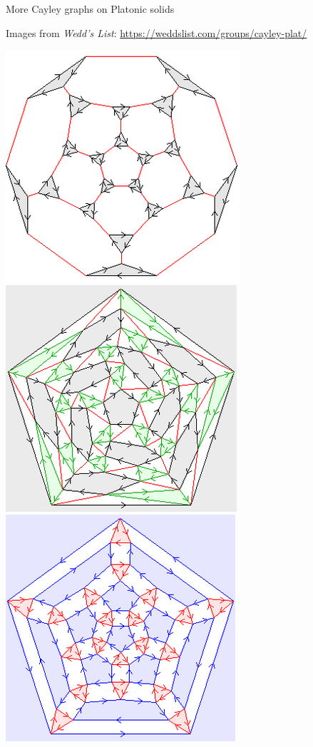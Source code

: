 \documentclass[8pt, handout]{beamer}
\newcommand{\Pause}{}
\begin{document}
\begin{frame}{More Cayley graphs on Platonic solids}

  Images from \emph{Wedd's List}:\;\;
  \url{https://weddslist.com/groups/cayley-plat/} %
  
  \begin{center}
    \includegraphics[width=.32\textwidth]{trunc-dodecahedron.png}
    \includegraphics[width=.32\textwidth]{snub-dodecahedron.png}
    \includegraphics[width=.32\textwidth]{small-rhombicosidodec.png}
  \end{center}
  

\end{frame}
\end{document}
